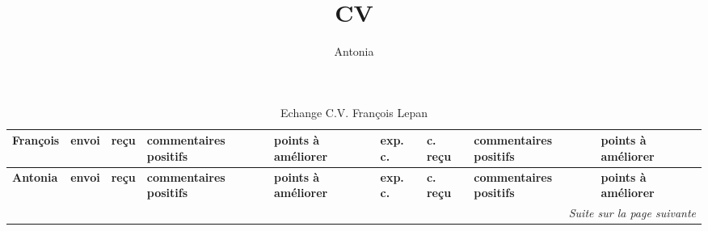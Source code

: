 \documentclass[a4paper,11pt]{article}
\title{CV}
\author{Antonia}
\begin{document}
\begin{landscape}
  \footnotesize   
  \begin{longtable}{|l|l|l|p{4cm}|p{4cm}|l|l|p{4cm}|p{4cm}|}
    \caption{Echange C.V. François Lepan}\\
    \hline \bfseries François&\bfseries envoi&\bfseries reçu&\bfseries
    commentaires positifs&\bfseries points à améliorer&\bfseries
    exp. c.&\bfseries c. reçu&\bfseries commentaires positifs&\bfseries points à
    améliorer\\ \hline \hline
    \endfirsthead
    \hline \bfseries Antonia&\bfseries envoi&\bfseries reçu&\bfseries
    commentaires positifs&\bfseries points à améliorer&\bfseries
    exp. c.&\bfseries c. reçu&\bfseries commentaires positifs&\bfseries points à
    améliorer\\ \hline \hline
    \endhead 
    \hline \multicolumn{9}{r}{\emph{Suite sur la page suivante}}
    \endfoot
    \hline
    \endlastfoot
    \hline
             
    Amara T.  & 24/10 & 2/11 %
			  & \begin{itemize}
				\item informations importantes présentes
				\item plutôt sobre et donc lisible
				\item rubrique bien placé
				\item pas de photo :)
				\end{itemize}
			  & \begin{itemize}
				\item agencement  : dates  + tabulation + intituler du poste (en dessous et aligné à l'intituler les informations)
				\item évite de mettre trop de police différentes (une ou 2 suffit)
				\item réserver le gras pour les informations a faire sortir comme compétences info ou compétence d'activité profesionnelles
				\item "Utilisation de Word, Power Point, Paint" ... inutile t'es informaticienne pas secrétaire ou designer :)
				\item adresse mail non souligner et pas de lien web
				\end{itemize}
			  & 14/11 & ?
			  & \begin{itemize}
				\item ?
				\end{itemize}
			  & \begin{itemize}
				\item ?
				\end{itemize} \\ \hline


\end{longtable}
\end{landscape}
\end{document}
